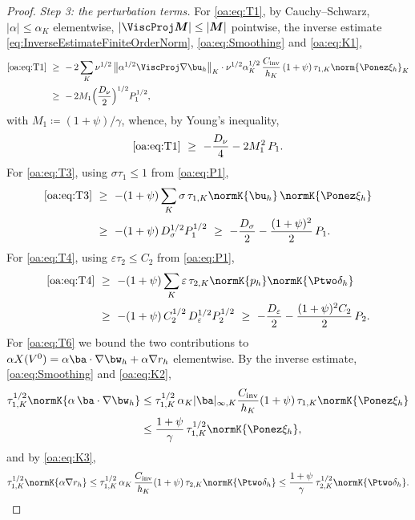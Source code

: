 \begin{proof}
\medskip\noindent\emph{Step 3: the perturbation terms.}
For \cref{oa:eq:T1}, by Cauchy--Schwarz, $|\alpha| \le \alpha_K$ elementwise,
$|\ViscProj \boldsymbol{M}| \le |\boldsymbol{M}|$ pointwise, the inverse estimate
\cref{eq:InverseEstimateFiniteOrderNorm}, \cref{oa:eq:Smoothing} and \cref{oa:eq:K1},
\begin{align*}
  \text{\cref{oa:eq:T1}}
  &\ \ge\ -\,2\sum_K \nu^{1/2}\,\bigl\lVert\alpha^{1/2}\ViscProj\nabla\bu_h\bigr\rVert_K
  \cdot \nu^{1/2}\alpha_K^{1/2}\,\frac{C_{\mathrm{inv}}}{h_K}\,(1+\psi)\,\tau_{1,K}
  \norm{\Ponez\xi_h}_K\\
  &\ \ge\ -\,2 M_1 \Bigl(\frac{D_\nu}{2}\Bigr)^{1/2} P_1^{1/2},
\end{align*}
with $M_1 \coloneqq (1+\psi)/\gamma$, whence, by Young's inequality,
\[
  \text{\cref{oa:eq:T1}} \ \ge\ -\frac{D_\nu}{4} - 2M_1^2\, P_1 .
\]
For \cref{oa:eq:T3}, using $\sigma\tau_1 \le 1$ from \cref{oa:eq:P1},
\begin{align*}
  \text{\cref{oa:eq:T3}}
  &\ \ge\ -(1+\psi)\sum_K \sigma\,\tau_{1,K}\normK{\bu_h}\,\normK{\Ponez\xi_h}\\
  &\ \ge\ -(1+\psi)\, D_\sigma^{1/2} P_1^{1/2}
  \ \ge\ -\frac{D_\sigma}{2} - \frac{(1+\psi)^2}{2}\,P_1 .
\end{align*}
For \cref{oa:eq:T4}, using $\varepsilon\tau_2 \le C_2$ from \cref{oa:eq:P1},
\begin{align*}
  \text{\cref{oa:eq:T4}}
  &\ \ge\ -(1+\psi)\sum_K \varepsilon\,\tau_{2,K}\normK{p_h}\normK{\Ptwo\delta_h}\\
  &\ \ge\ -(1+\psi)\,C_2^{1/2}\, D_\varepsilon^{1/2} P_2^{1/2}
  \ \ge\ -\frac{D_\varepsilon}{2} - \frac{(1+\psi)^2 C_2}{2}\,P_2 .
\end{align*}
For \cref{oa:eq:T6} we bound the two contributions to
$\alpha X(V^0) = \alpha\ba\cdot\nabla\bw_h + \alpha\nabla r_h$ elementwise. By the
inverse estimate, \cref{oa:eq:Smoothing} and \cref{oa:eq:K2},
\[
\begin{aligned}
  \tau_{1,K}^{1/2}\normK{\alpha\,\ba\cdot\nabla\bw_h}
  &\le \tau_{1,K}^{1/2}\,\alpha_K |\ba|_{\infty,K}\frac{C_{\mathrm{inv}}}{h_K}
  (1+\psi)\,\tau_{1,K}\normK{\Ponez\xi_h} \\
  &\le \frac{1+\psi}{\gamma}\,\tau_{1,K}^{1/2}\normK{\Ponez\xi_h},
\end{aligned}
\]
and by \cref{oa:eq:K3},
\[
  \tau_{1,K}^{1/2}\normK{\alpha\nabla r_h}
  \le \tau_{1,K}^{1/2}\,\alpha_K\,\frac{C_{\mathrm{inv}}}{h_K}(1+\psi)\,
  \tau_{2,K}\normK{\Ptwo\delta_h}
  \le \frac{1+\psi}{\gamma}\,\tau_{2,K}^{1/2}\normK{\Ptwo\delta_h}.
\]
\end{proof}
